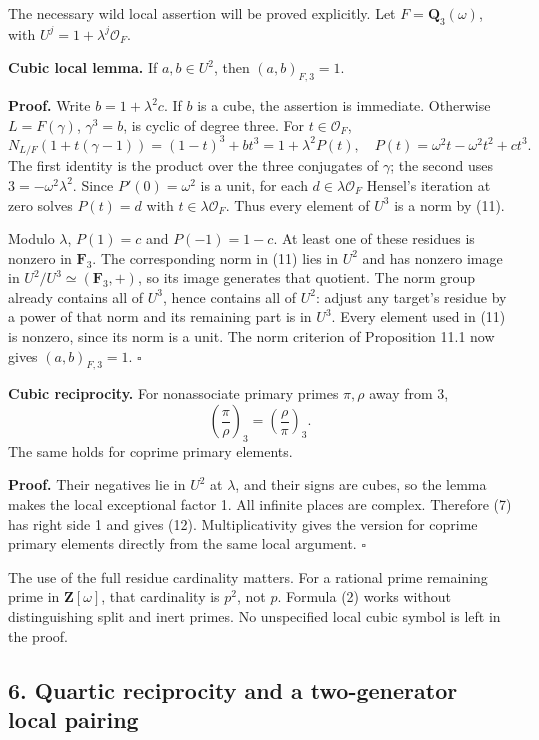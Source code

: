 \documentclass[11pt,a4paper]{article}
\begin{document}
The necessary wild local assertion will be proved explicitly. Let
\(F=\mathbf Q_3(\omega)\), with \(U^j=1+\lambda^j\mathcal O_F\).

\textbf{Cubic local lemma.} If \(a,b\in U^2\), then \((a,b)_{F,3}=1\).

\textbf{Proof.} Write \(b=1+\lambda^2 c\). If \(b\) is a cube, the
assertion is immediate. Otherwise \(L=F(\gamma)\), \(\gamma^3=b\), is
cyclic of degree three. For \(t\in\mathcal O_F\), \[
N_{L/F}(1+t(\gamma-1))=(1-t)^3+bt^3
=1+\lambda^2 P(t),
\quad P(t)=\omega^2t-\omega^2t^2+ct^3.
\tag{11}
\] The first identity is the product over the three conjugates of
\(\gamma\); the second uses \(3=-\omega^2\lambda^2\). Since
\(P'(0)=\omega^2\) is a unit, for each \(d\in\lambda\mathcal O_F\)
Hensel's iteration at zero solves \(P(t)=d\) with
\(t\in\lambda\mathcal O_F\). Thus every element of \(U^3\) is a norm by
(11).

Modulo \(\lambda\), \(P(1)=c\) and \(P(-1)=1-c\). At least one of these
residues is nonzero in \(\mathbf F_3\). The corresponding norm in (11)
lies in \(U^2\) and has nonzero image in
\(U^2/U^3\simeq(\mathbf F_3,+)\), so its image generates that quotient.
The norm group already contains all of \(U^3\), hence contains all of
\(U^2\): adjust any target's residue by a power of that norm and its
remaining part is in \(U^3\). Every element used in (11) is nonzero,
since its norm is a unit. The norm criterion of Proposition 11.1 now
gives \((a,b)_{F,3}=1\). \(\square\)

\textbf{Cubic reciprocity.} For nonassociate primary primes \(\pi,\rho\)
away from 3, \[
\left(\frac\pi\rho\right)_3=\left(\frac\rho\pi\right)_3.
\tag{12}
\] The same holds for coprime primary elements.

\textbf{Proof.} Their negatives lie in \(U^2\) at \(\lambda\), and their
signs are cubes, so the lemma makes the local exceptional factor 1. All
infinite places are complex. Therefore (7) has right side 1 and gives
(12). Multiplicativity gives the version for coprime primary elements
directly from the same local argument. \(\square\)

The use of the full residue cardinality matters. For a rational prime
remaining prime in \(\mathbf Z[\omega]\), that cardinality is \(p^2\),
not \(p\). Formula (2) works without distinguishing split and inert
primes. No unspecified local cubic symbol is left in the proof.

\subsection{6. Quartic reciprocity and a two-generator local
pairing}\label{quartic-reciprocity-and-a-two-generator-local-pairing}
\end{document}
